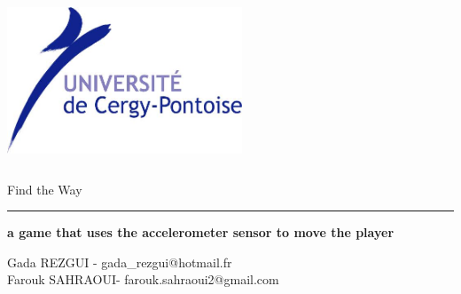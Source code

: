\begin{titlepage}

\includegraphics   [width=7cm, height=5cm] {Logo_UCP.png} 

\begin{flushright}\huge
\color{bleu}
Find the Way 
\end{flushright}
\hrule
\begin{flushleft}\huge\bfseries
\color{violet}
a game that uses the accelerometer sensor to move the player
\end{flushleft}


\begin{center}
 \large
\color{bleu}
Gada REZGUI - gada\_rezgui@hotmail.fr \\
 Farouk SAHRAOUI- farouk.sahraoui2@gmail.com



\end{center}

\end{titlepage}